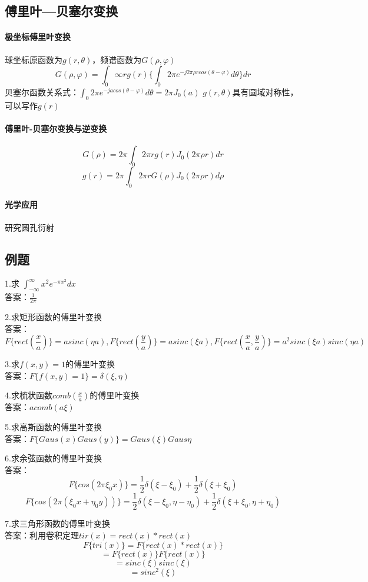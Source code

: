 \documentclass[UTF8]{ctexart}
\newcommand{\f}[2]{\frac{#1}{#2}}%
\begin{document}
\subsection{傅里叶—贝塞尔变换}
\paragraph{极坐标傅里叶变换}球坐标原函数为$g(r,\theta)$，频谱函数为$G(\rho,\varphi)$
\[
  G(\rho,\varphi)=\int_{0}{\infty}rg(r)\{\int_{0}{2\pi}e^{-j2\pi\rho rcos(\theta-\varphi)}d\theta\}dr
  \]
  贝塞尔函数关系式：$\int_{0}{2\pi}e^{-jacos(\theta-\varphi)}d\theta=2\pi J_{0}(a)$
$g(r,\theta)$具有圆域对称性，可以写作$g(r)$
\paragraph{傅里叶-贝塞尔变换与逆变换}
\[
    G(\rho)=2\pi\int_{0}{2\pi}rg(r)J_{0}(2\pi\rho r)dr
    \]
\[
    g(r)=2\pi\int_{0}{2\pi}rG(\rho)J_{0}(2\pi\rho r)d\rho
    \]
\paragraph{光学应用}研究圆孔衍射   

\subsection{例题}
1.求
$\int_{-\infty}^{\infty}x^2e^{-\pi x^2}dx$\\
答案：$\f{1}{2\pi}$

2.求矩形函数的傅里叶变换\\
答案：\[ F\{rect(\f{x}{a})\}=asinc(\eta a),F\{rect(\f{y}{a})\}=asinc(\xi a),F\{rect(\f{x}{a},\f{y}{a})\}=a^2sinc(\xi a)sinc(\eta a)
\]

3.求$f(x,y)=1$的傅里叶变换\\
答案：$F\{f(x,y)=1\}=\delta(\xi,\eta)$

4.求梳状函数$comb(\f{x}{a})$的傅里叶变换\\
答案：$acomb(a\xi)$

5.求高斯函数的傅里叶变换\\
答案：$F\{Gaus(x)Gaus(y)\}=Gaus(\xi)Gaus{\eta}$

6.求余弦函数的傅里叶变换\\
答案：\[
    F\{cos(2\pi \xi_{0}x)\}=\f{1}{2}\delta(\xi-\xi_{0})+\f{1}{2}\delta(\xi+\xi_{0})
\]
\[
    F\{cos(2\pi (\xi_{0}x+\eta_{0}y))\}=\f{1}{2}\delta(\xi-\xi_{0},\eta-\eta_{0})+\f{1}{2}\delta(\xi+\xi_{0},\eta+\eta_{0})
\]

7.求三角形函数的傅里叶变换\\
答案：利用卷积定理$tir(x)=rect(x)*rect(x)$
\[
F\{tri(x)\}=F\{rect(x)*rect(x)\}
    \]
\[=F\{rect(x)\}F\{rect(x)\}
    \]
\[=sinc(\xi)sinc(\xi)
    \]
\[=sinc^2(\xi)
    \]
\end{document}
